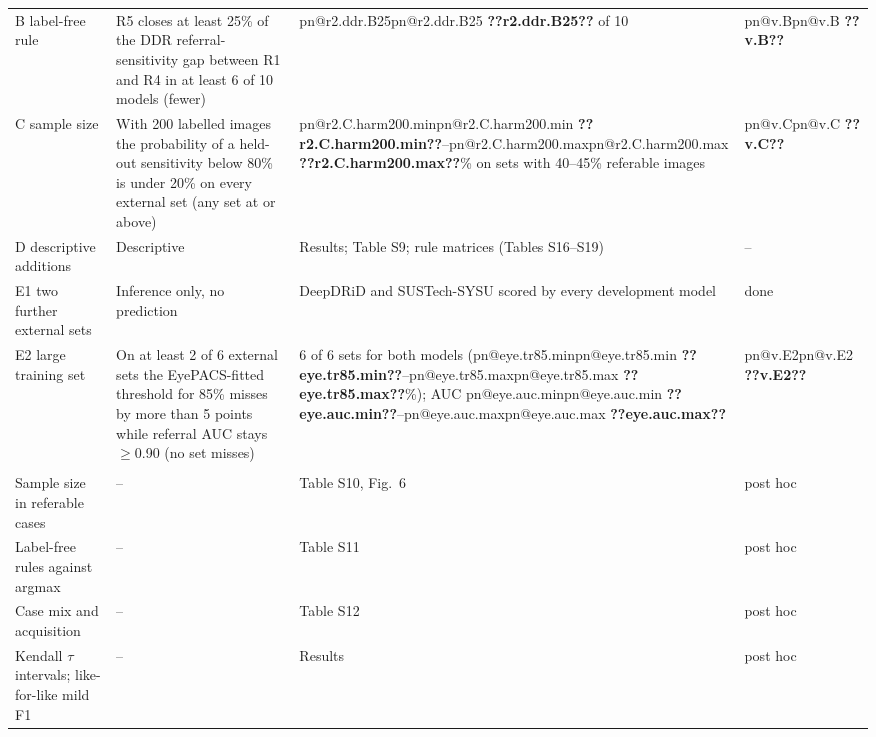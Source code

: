 \documentclass[11pt]{article}
\makeatletter
\newcommand{\pn}[1]{\ifcsname pn@#1\endcsname\csname pn@#1\endcsname\else
  \@latex@error{Undefined number key `#1'}{Run src/paper_numbers.py}\textbf{??#1??}\fi}
\makeatother
\begin{document}
\begin{longtable}{@{}p{2.3cm}p{5.6cm}p{5.8cm}p{1.6cm}@{}}
B label-free rule & R5 closes at least 25\% of the DDR referral-sensitivity gap between R1 and R4 in
at least 6 of 10 models (fewer) & \pn{r2.ddr.B25} of 10 & \pn{v.B} \\
C sample size & With 200 labelled images the probability of a held-out sensitivity below 80\% is
under 20\% on every external set (any set at or above) & \pn{r2.C.harm200.min}--\pn{r2.C.harm200.max}\%
on sets with 40--45\% referable images & \pn{v.C} \\
D descriptive additions & Descriptive & Results; Table S9; rule matrices (Tables S16--S19) & -- \\
E1 two further external sets & Inference only, no prediction & DeepDRiD and SUSTech-SYSU scored by
every development model & done \\
E2 large training set & On at least 2 of 6 external sets the EyePACS-fitted threshold for 85\%
misses by more than 5 points while referral AUC stays $\geq$0.90 (no set misses) & 6 of 6 sets for
both models (\pn{eye.tr85.min}--\pn{eye.tr85.max}\%); AUC \pn{eye.auc.min}--\pn{eye.auc.max} &
\pn{v.E2} \\
\addlinespace
\multicolumn{4}{@{}l}{\emph{Added after an internal editorial assessment (post hoc)}}\\
Sample size in referable cases & -- & Table S10, Fig.~6 & post hoc \\
Label-free rules against argmax & -- & Table S11 & post hoc \\
Case mix and acquisition & -- & Table S12 & post hoc \\
Kendall $\tau$ intervals; like-for-like mild F1 & -- & Results & post hoc \\
\bottomrule
\end{longtable}
\endgroup
\end{document}
